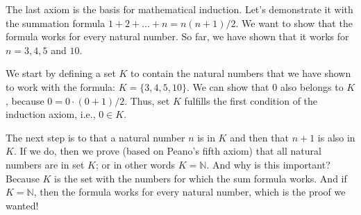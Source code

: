 \documentclass[letterpaper,10pt,english]{sphinxmanual}
\begin{document}
The last axiom is the basis for mathematical induction. Let’s demonstrate it with the summation formula \(1+2+\ldots+n = n(n+1)/2\). We want to show that the formula works for every natural number. So far, we have shown that it works for \(n=3, 4, 5\) and \(10\).

We start by defining a set \(K\) to contain the natural numbers that we have shown to work with the formula: \(K=\{3, 4, 5, 10\}\). We can show that \(0\) also belongs to \(K\), because \(0=0\cdot(0+1)/2\). Thus, set \(K\) fulfills the first condition of the induction axiom, i.e., \(0 \in K\).

The next step is to  that a natural number \(n\) is in \(K\) and then  that \(n+1\) is also in \(K\). If we do, then we prove (based on Peano’s fifth axiom) that all natural numbers are in set \(K\); or in other words \(K=\mathbb{N}\). And why is this important? Because \(K\) is the set with the numbers for which the sum formula works. And if  \(K=\mathbb{N}\), then the formula works for every natural number, which is the proof we wanted!
\end{document}

